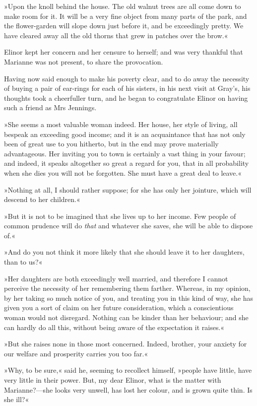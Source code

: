 »Upon the knoll behind the house. The old walnut trees are all come down to make room for it. It will be a very fine object from many parts of the park, and the flower-garden will slope down just before it, and be exceedingly pretty. We have cleared away all the old thorns that grew in patches over the brow.«

Elinor kept her concern and her censure to herself; and was very thankful that Marianne was not present, to share the provocation.

Having now said enough to make his poverty clear, and to do away the necessity of buying a pair of ear-rings for each of his sisters, in his next visit at Gray’s, his thoughts took a cheerfuller turn, and he began to congratulate Elinor on having such a friend as Mrs Jennings.

»She seems a most valuable woman indeed. Her house, her style of living, all bespeak an exceeding good income; and it is an acquaintance that has not only been of great use to you hitherto, but in the end may prove materially advantageous. Her inviting you to town is certainly a vast thing in your favour; and indeed, it speaks altogether so great a regard for you, that in all probability when she dies you will not be forgotten. She must have a great deal to leave.«

»Nothing at all, I should rather suppose; for she has only her jointure, which will descend to her children.«

»But it is not to be imagined that she lives up to her income. Few people of common prudence will do \textit{that} and whatever she saves, she will be able to dispose of.«

»And do you not think it more likely that she should leave it to her daughters, than to us?«

»Her daughters are both exceedingly well married, and therefore I cannot perceive the necessity of her remembering them farther. Whereas, in my opinion, by her taking so much notice of you, and treating you in this kind of way, she has given you a sort of claim on her future consideration, which a conscientious woman would not disregard. Nothing can be kinder than her behaviour; and she can hardly do all this, without being aware of the expectation it raises.«

»But she raises none in those most concerned. Indeed, brother, your anxiety for our welfare and prosperity carries you too far.«

»Why, to be sure,« said he, seeming to recollect himself, »people have little, have very little in their power. But, my dear Elinor, what is the matter with Marianne?—she looks very unwell, has lost her colour, and is grown quite thin. Is she ill?«

